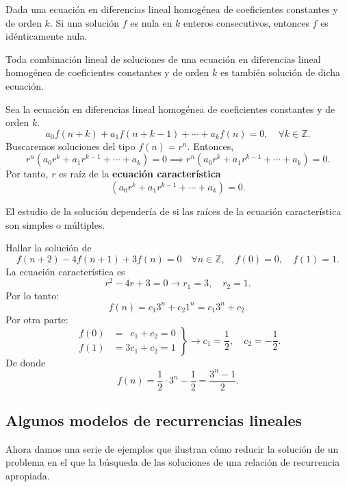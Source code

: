 \begin{theorem}{}
	Dada una ecuación en diferencias lineal homogénea de coeficientes constantes y de orden $k$. Si una solución $f$ es nula en $k$ enteros consecutivos, entonces $f$ es idénticamente nula.
\end{theorem}

\begin{theorem}{}
	Toda combinación lineal de soluciones de una ecuación en diferencias lineal homogénea de coeficientes constantes y de orden $k$ es también solución de dicha ecuación.
\end{theorem}

\begin{definition}
Sea la ecuación en diferencias lineal homogénea de coeficientes constantes y de orden $k$. \[ a_{0}f(n+k)+a_{1}f(n+k-1)+\cdots+a_{k}f(n)=0,\quad\forall k\in\mathds{Z}. \] Buscaremos soluciones del tipo $f(n)=r^{n}.$ Entonces, \[ r^{n}\left(a_{0}r^{k}+a_{1}r^{k-1}+\cdots+a_{k}\right)=0\implies r^{n}(a_{0}r^{k}+a_{1}r^{k-1}+\cdots+a_{k})=0. \] Por tanto, $r$ es raíz de la \textbf{ecuación característica} \[ (a_{0}r^{k}+a_{1}r^{k-1}+\cdots+a_{k})=0. \]
\end{definition}

El estudio de la solución dependería de si las raíces de la ecuación característica son simples o múltiples.
\begin{example}
	Hallar la solución de \[ f(n+2)-4f(n+1)+3f(n)=0\quad\forall n\in\mathds{Z},\quad f(0)=0,\quad f(1)=1. \] La ecuación característica es \[ r^{2}-4r+3=0\rightarrow r_{1}=3,\quad r_{2}=1. \] Por lo tanto: \[ f(n)=c_{1}3^{n}+c_{2}1^{n}=c_{1}3^{n}+c_{2}. \] Por otra parte:
	\begin{equation*}
	\left.\begin{aligned}
	f(0)&=\phantom{1}c_{1}+c_{2}=0\\
	f(1)&=3c_{1}+c_{2}=1
	\end{aligned}
	\right\}
	\longrightarrow c_{1}=\frac{1}{2},\quad c_{2}=-\frac{1}{2}.
	\end{equation*}
De donde \[ f(n)=\frac{1}{2}\cdot3^{n}-\frac{1}{2}=\frac{3^{n}-1}{2}. \]
\end{example}

\subsection{Algunos modelos de recurrencias lineales}

Ahora damos una serie de ejemplos que ilustran cómo reducir la solución de un problema en el que la búsqueda de las soluciones de una relación de recurrencia apropiada.

